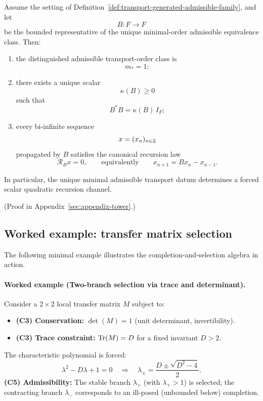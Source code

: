 \begin{theorem}
\label{thm:transport-generation-forces-scalar-recursion}
Assume the setting of
Definition~\ref{def:transport-generated-admissible-family}, and let
\[
B:F\to F
\]
be the bounded representative of the unique minimal-order admissible
equivalence class. Then:
\begin{enumerate}[label=(\roman*), leftmargin=2em, itemsep=0.2em]
\item the distinguished admissible transport-order class is
      \[
      m_\ast=1;
      \]
\item there exists a unique scalar
      \[
      \kappa(B)\ge 0
      \]
      such that
      \[
      B^*B=\kappa(B)\,I_F;
      \]
\item every bi-infinite sequence
      \[
      x=(x_n)_{n\in\mathbb{Z}}
      \]
      propagated by $B$ satisfies the canonical recursion law
      \[
      \mathcal R_Bx=0,
      \qquad\text{equivalently}\qquad
      x_{n+1}=Bx_n-x_{n-1}.
      \]
\end{enumerate}
In particular, the unique minimal admissible transport datum determines a
forced scalar quadratic recursion channel.
\end{theorem}

(Proof in Appendix~\ref{sec:appendix-tower}.)

\subsection{Worked example: transfer matrix selection}

The following minimal example illustrates the completion-and-selection algebra in action.

\paragraph{Worked example (Two-branch selection via trace and determinant).}
\label{ex:transfer-compiler}
Consider a $2 \times 2$ local transfer matrix $M$ subject to:
\begin{itemize}[itemsep=0.2em]
\item \textbf{(C3) Conservation:} $\det(M) = 1$ (unit determinant, invertibility).
\item \textbf{(C3) Trace constraint:} $\mathrm{Tr}(M) = D$ for a fixed invariant $D > 2$.
\end{itemize}
The characteristic polynomial is forced:
\[
\lambda^2 - D\lambda + 1 = 0
\quad\Rightarrow\quad
\lambda_\pm = \frac{D \pm \sqrt{D^2 - 4}}{2}.
\]
\textbf{(C5) Admissibility:} The stable branch $\lambda_+$ (with $\lambda_+ > 1$) is selected; the contracting branch $\lambda_-$ corresponds to an ill-posed (unbounded below) completion.

